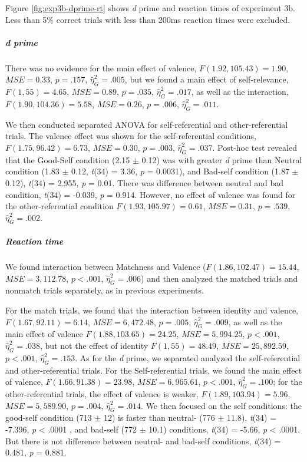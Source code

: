\documentclass[
  english,
  man]{apa6}
\let\oldsubparagraph\subparagraph
\renewcommand{\subparagraph}[1]{\oldsubparagraph{#1}\mbox{}}
\begin{document}
Figure \ref{fig:exp3b-dprime-rt} shows \emph{d} prime and reaction times of experiment 3b. Less than 5\% correct trials with less than 200ms reaction times were excluded.

\hypertarget{d-prime-5}{%
\subparagraph{d prime}\label{d-prime-5}}

There was no evidence for the main effect of valence, \(F(1.92, 105.43) = 1.90\), \(\mathit{MSE} = 0.33\), \(p = .157\), \(\hat{\eta}^2_G = .005\), but we found a main effect of self-relevance, \(F(1, 55) = 4.65\), \(\mathit{MSE} = 0.89\), \(p = .035\), \(\hat{\eta}^2_G = .017\), as well as the interaction, \(F(1.90, 104.36) = 5.58\), \(\mathit{MSE} = 0.26\), \(p = .006\), \(\hat{\eta}^2_G = .011\).

We then conducted separated ANOVA for self-referential and other-referential trials. The valence effect was shown for the self-referential conditions, \(F(1.75, 96.42) = 6.73\), \(\mathit{MSE} = 0.30\), \(p = .003\), \(\hat{\eta}^2_G = .037\). Post-hoc test revealed that the Good-Self condition (2.15 \(\pm\) 0.12) was with greater \emph{d} prime than Neutral condition (1.83 \(\pm\) 0.12, \emph{t}(34) = 3.36, \emph{p} = 0.0031), and Bad-self condition (1.87 \(\pm\) 0.12), \emph{t}(34) = 2.955, \emph{p} = 0.01. There was difference between neutral and bad condition, \emph{t}(34) = -0.039, \emph{p} = 0.914. However, no effect of valence was found for the other-referential condition \(F(1.93, 105.97) = 0.61\), \(\mathit{MSE} = 0.31\), \(p = .539\), \(\hat{\eta}^2_G = .002\).

\hypertarget{reaction-time-6}{%
\subparagraph{Reaction time}\label{reaction-time-6}}

We found interaction between Matchness and Valence (\(F(1.86, 102.47) = 15.44\), \(\mathit{MSE} = 3,112.78\), \(p < .001\), \(\hat{\eta}^2_G = .006\)) and then analyzed the matched trials and nonmatch trials separately, as in previous experiments.

For the match trials, we found that the interaction between identity and valence, \(F(1.67, 92.11) = 6.14\), \(\mathit{MSE} = 6,472.48\), \(p = .005\), \(\hat{\eta}^2_G = .009\), as well as the main effect of valence \(F(1.88, 103.65) = 24.25\), \(\mathit{MSE} = 5,994.25\), \(p < .001\), \(\hat{\eta}^2_G = .038\), but not the effect of identity \(F(1, 55) = 48.49\), \(\mathit{MSE} = 25,892.59\), \(p < .001\), \(\hat{\eta}^2_G = .153\). As for the \emph{d} prime, we separated analyzed the self-referential and other-referential trials. For the Self-referential trials, we found the main effect of valence, \(F(1.66, 91.38) = 23.98\), \(\mathit{MSE} = 6,965.61\), \(p < .001\), \(\hat{\eta}^2_G = .100\); for the other-referential trials, the effect of valence is weaker, \(F(1.89, 103.94) = 5.96\), \(\mathit{MSE} = 5,589.90\), \(p = .004\), \(\hat{\eta}^2_G = .014\). We then focused on the self conditions: the good-self condition (713 \(\pm\) 12) is faster than neutral- (776 \(\pm\) 11.8), \emph{t}(34) = -7.396, \emph{p} \textless{} .0001 , and bad-self (772 \(\pm\) 10.1) conditions, \emph{t}(34) = -5.66, \emph{p} \textless{} .0001. But there is not difference between neutral- and bad-self conditions, \emph{t}(34) = 0.481, \emph{p} = 0.881.
\end{document}
